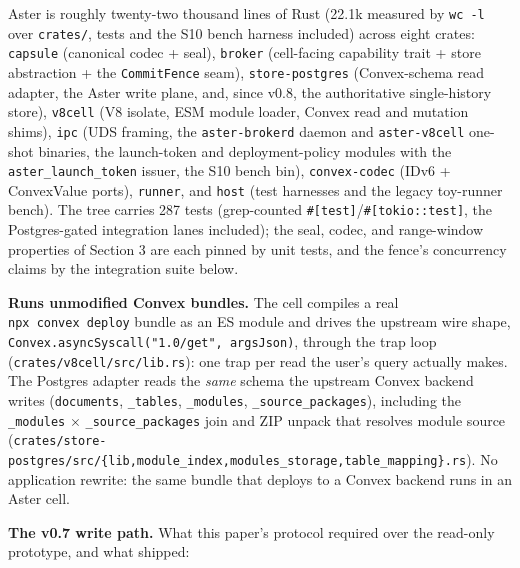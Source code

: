 \documentclass[
  11pt,
]{article}
\begin{document}
Aster is roughly twenty-two thousand lines of Rust (22.1k measured by \texttt{wc\ -l} over \texttt{crates/}, tests and the S10 bench harness included) across eight crates: \texttt{capsule} (canonical codec + seal), \texttt{broker} (cell-facing capability trait + store abstraction + the \texttt{CommitFence} seam), \texttt{store-postgres} (Convex-schema read adapter, the Aster write plane, and, since v0.8, the authoritative single-history store), \texttt{v8cell} (V8 isolate, ESM module loader, Convex read and mutation shims), \texttt{ipc} (UDS framing, the \texttt{aster-brokerd} daemon and \texttt{aster-v8cell} one-shot binaries, the launch-token and deployment-policy modules with the \texttt{aster\_launch\_token} issuer, the S10 bench bin), \texttt{convex-codec} (IDv6 + ConvexValue ports), \texttt{runner}, and \texttt{host} (test harnesses and the legacy toy-runner bench). The tree carries 287 tests (grep-counted \texttt{\#{[}test{]}}/\texttt{\#{[}tokio::test{]}}, the Postgres-gated integration lanes included); the seal, codec, and range-window properties of Section 3 are each pinned by unit tests, and the fence's concurrency claims by the integration suite below.

\textbf{Runs unmodified Convex bundles.} The cell compiles a real \texttt{npx\ convex\ deploy} bundle as an ES module and drives the upstream wire shape, \texttt{Convex.asyncSyscall("1.0/get",\ argsJson)}, through the trap loop (\texttt{crates/v8cell/src/lib.rs}): one trap per read the user's query actually makes. The Postgres adapter reads the \emph{same} schema the upstream Convex backend writes (\texttt{documents}, \texttt{\_tables}, \texttt{\_modules}, \texttt{\_source\_packages}), including the \texttt{\_modules} $\times$ \texttt{\_source\_packages} join and ZIP unpack that resolves module source (\texttt{crates/store-postgres/src/\{lib,module\_index,modules\_storage,table\_mapping\}.rs}). No application rewrite: the same bundle that deploys to a Convex backend runs in an Aster cell.

\textbf{The v0.7 write path.} What this paper's protocol required over the read-only prototype, and what shipped:
\end{document}
